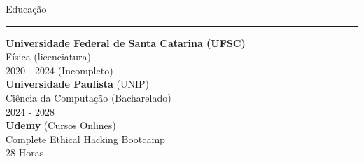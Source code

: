\documentclass{letter}
\begin{document}
\begin{minipage}[t]{0.60\textwidth}
\begin{itemize}
\end{itemize}


{\large Educação}
\rule{\linewidth}{0.4pt}

{\large \textbf{Universidade Federal de Santa Catarina (UFSC)}}\\
{\small Física (licenciatura)} \\
{\small 2020 - 2024 (Incompleto)}\\
{\large \textbf{Universidade Paulista} (UNIP)}\\
{\small Ciência da Computação (Bacharelado)} \\
{\small 2024 - 2028} \\
{\large \textbf{Udemy} (Cursos Onlines)}\\
{\small Complete Ethical Hacking Bootcamp} \\
{\small 28 Horas} \\


\end{minipage}
\end{document}
